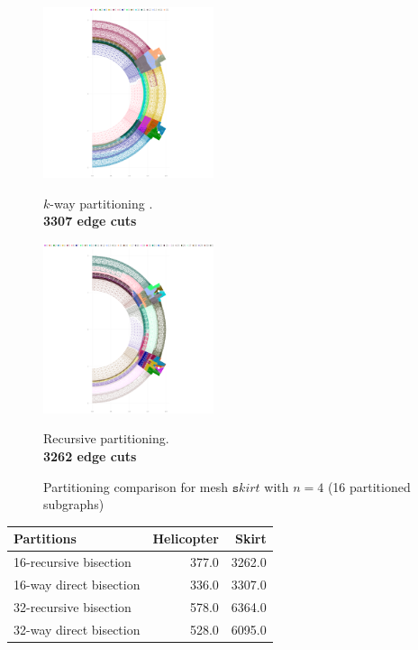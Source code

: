 \documentclass[unicode,11pt,a4paper,oneside,numbers=endperiod,openany]{scrartcl}
\begin{document}
\begin{figure}[h!]
    \begin{minipage}{0.5\textwidth}
        \centering
        \includegraphics[height=5cm]{fig/plot/metis/metis-skirt-kway-p16-cut_3307.0.png}
        \caption{$k$-way partitioning .\\\textbf{3307 edge cuts}}
    \end{minipage}
    \begin{minipage}{0.5\textwidth}
        \centering
        \includegraphics[height=5cm]{fig/plot/metis/metis-skirt-recursive-p16-cut_6364.0.png}
        \caption{Recursive partitioning.\\\textbf{3262 edge cuts}}
    \end{minipage}
    \caption*{Partitioning comparison for mesh $\texttt skirt$ with $n=4$ (16 partitioned subgraphs)}
\end{figure}

\begin{table}[h!]
\centering
\begin{tabular}{l|r|r} \hline\hline 
              Partitions & Helicopter &  Skirt \\
\hline
  16-recursive bisection &      377.0 & 3262.0 \\
 16-way direct bisection &      336.0 & 3307.0 \\
  32-recursive bisection &      578.0 & 6364.0 \\
 32-way direct bisection &      528.0 & 6095.0 \\
 \hline \hline
\end{tabular}              
\label{table:Compare_Metis}
\end{table}
\end{document}
